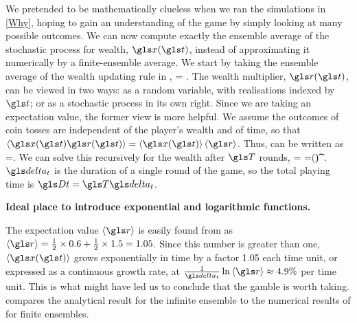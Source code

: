 We pretended to be mathematically clueless when we ran the simulations in \cref{Why}, hoping to gain an understanding of the game by simply looking at many possible outcomes. We can now compute exactly the ensemble average of the stochastic process for wealth, $\x(\t)$, instead of approximating it numerically by a finite-ensemble average. We start by taking the ensemble average of the wealth updating rule in ,
\be
\ave{\x(\t+\dt)} = \ave{\x(\t)\gr(\t)}.
\ee
The wealth multiplier, $\gr(\t)$, can be viewed in two ways: as a random variable, with realisations indexed by $\t$; or as a stochastic process in its own right. Since we are taking an expectation value, the former view is more helpful. We assume the outcomes of coin tosses are independent of the player's wealth and of time, so that $\ave{\x(\t)\gr(\t)} = \ave{\x(\t)}\ave{\gr}$. Thus,  can be written as
\be
\ave{\x(\t+\dt)}=\ave{\x(\t)}\ave{\gr}.
\ee
We can solve this recursively for the wealth after $\T$ rounds,
\be
\ave{\x(\t+\Dt)} = \ave{\x(\t+\T\dt)}=\x(\t)\ave{\gr}^\T.
\ee
$\dt$ is the duration of a single round of the game, so the total playing time is $\Dt=\T\dt$.

\textbf{Ideal place to introduce exponential and logarithmic functions.}

The expectation value $\ave{\gr}$ is easily found from  
as $\ave{\gr}=\frac{1}{2}\times 0.6 + \frac{1}{2}\times 1.5=1.05$. Since 
this number is greater than one, $\ave{\x(\t)}$ grows exponentially in 
time by a factor 1.05 each time unit, or expressed as a continuous 
growth rate, at $\frac{1}{\dt}\ln \ave{\gr}\approx4.9\%$ per time 
unit. This is what might have led us to
conclude that the gamble is worth taking.  compares the
analytical result for the infinite ensemble to the numerical results 
of  for finite ensembles.

